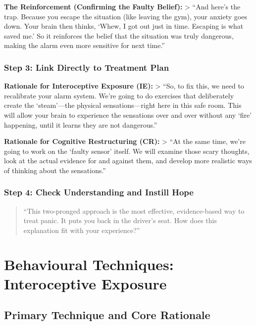 \documentclass[
  american,
  letterpaper,
  DIV=11,
  numbers=noendperiod]{scrartcl}
\begin{document}
\textbf{The Reinforcement (Confirming the Faulty Belief):}
\textgreater{} ``And here's the trap. Because you escape the situation
(like leaving the gym), your anxiety goes down. Your brain then thinks,
`Whew, I got out just in time. Escaping is what saved me.' So it
reinforces the belief that the situation was truly dangerous, making the
alarm even more sensitive for next time.''

\subsubsection{Step 3: Link Directly to Treatment
Plan}\label{step-3-link-directly-to-treatment-plan}

\textbf{Rationale for Interoceptive Exposure (IE):} \textgreater{} ``So,
to fix this, we need to recalibrate your alarm system. We're going to do
exercises that deliberately create the `steam'---the physical
sensations---right here in this safe room. This will allow your brain to
experience the sensations over and over without any `fire' happening,
until it learns they are not dangerous.''

\textbf{Rationale for Cognitive Restructuring (CR):} \textgreater{} ``At
the same time, we're going to work on the `faulty sensor' itself. We
will examine those scary thoughts, look at the actual evidence for and
against them, and develop more realistic ways of thinking about the
sensations.''

\subsubsection{Step 4: Check Understanding and Instill
Hope}\label{step-4-check-understanding-and-instill-hope}

\begin{quote}
``This two-pronged approach is the most effective, evidence-based way to
treat panic. It puts you back in the driver's seat. How does this
explanation fit with your experience?''
\end{quote}

\section{Behavioural Techniques: Interoceptive
Exposure}\label{behavioural-techniques-interoceptive-exposure}

\subsection{Primary Technique and Core
Rationale}\label{primary-technique-and-core-rationale}
\end{document}
